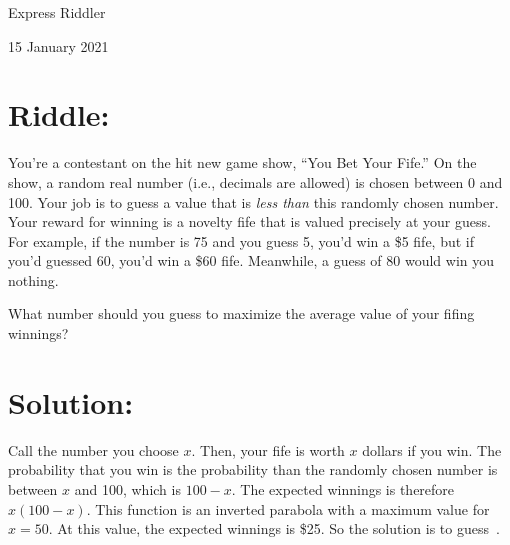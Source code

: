 \documentclass{article}
\begin{document}
\pagestyle{empty} %

\begin{center}
{\LARGE Express Riddler}

\vspace{0.15in}

{\Large 15 January 2021}
\end{center}


\section*{Riddle:}

You're a contestant on the hit new game show, ``You Bet Your Fife.''
On the show, a random real number (i.e., decimals are allowed) is chosen between 0 and 100. Your job is to guess a value that is \textit{less than} this randomly chosen number.
Your reward for winning is a novelty fife that is valued precisely at your guess.
For example, if the number is 75 and you guess 5, you'd win a \$5 fife, but if you'd guessed 60, you'd win a \$60 fife.
Meanwhile, a guess of 80 would win you nothing.

What number should you guess to maximize the average value of your fifing winnings?


\section*{Solution:}

Call the number you choose $x$.
Then, your fife is worth $x$ dollars if you win.
The probability that you win is the probability than the randomly chosen number is between $x$ and 100, which is $100-x$.
The expected winnings is therefore $x(100-x)$.
This function is an inverted parabola with a maximum value for $x=50$.
At this value, the expected winnings is \$25.
So the solution is to guess
\,.
\end{document}
